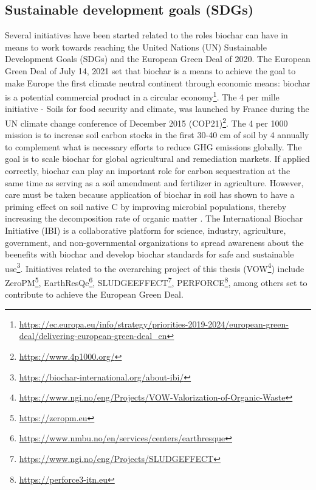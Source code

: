 \subsection{Sustainable development goals (SDGs) \label{sec:SDGs}}
Several initiatives have been started related to the roles biochar can have in means to work towards reaching the United Nations (UN) Sustainable Development Goals (SDGs) \citep{SDGs2015} and the European Green Deal of 2020. The European Green Deal of July 14, 2021 set that biochar is a means to achieve the goal to make Europe the first climate neutral continent through economic means: biochar is a potential commercial product in a circular economy\footnote{\url{https://ec.europa.eu/info/strategy/priorities-2019-2024/european-green-deal/delivering-european-green-deal_en}}. The 4 per mille initiative - Soils for food security and climate, was launched by France during the UN climate change conference of December 2015 (COP21)\footnote{\url{https://www.4p1000.org/}}. The 4 per 1000 mission is to increase soil carbon stocks in the first 30-40 cm of soil by 4 \textperthousand  annually to complement what is necessary efforts to reduce GHG emissions globally. The goal is to scale biochar for global agricultural and remediation markets. If applied correctly, biochar can play an important role for carbon sequestration at the same time as serving as a soil amendment and fertilizer in agriculture. However, care must be taken because application of biochar in soil has shown to have a priming effect on soil native C by improving microbial populations, thereby increasing the decomposition rate of organic matter \citep{Ahmad2014}. The International Biochar Initiative (IBI) is a collaborative platform for science, industry, agriculture, government, and non-governmental organizations to spread awareness about the beenefits with biochar and develop biochar standards for safe and sustainable use\footnote{\url{https://biochar-international.org/about-ibi/}}. Initiatives related to the overarching project of this thesis (VOW\footnote{\url{https://www.ngi.no/eng/Projects/VOW-Valorization-of-Organic-Waste}}) include ZeroPM\footnote{\url{https://zeropm.eu}}, EarthResQe\footnote{\url{https://www.nmbu.no/en/services/centers/earthresque}}, SLUDGEEFFECT\footnote{\url{https://www.ngi.no/eng/Projects/SLUDGEFFECT}}, PERFORCE\footnote{\url{https://perforce3-itn.eu}}, among others set to contribute to achieve the European Green Deal. 


